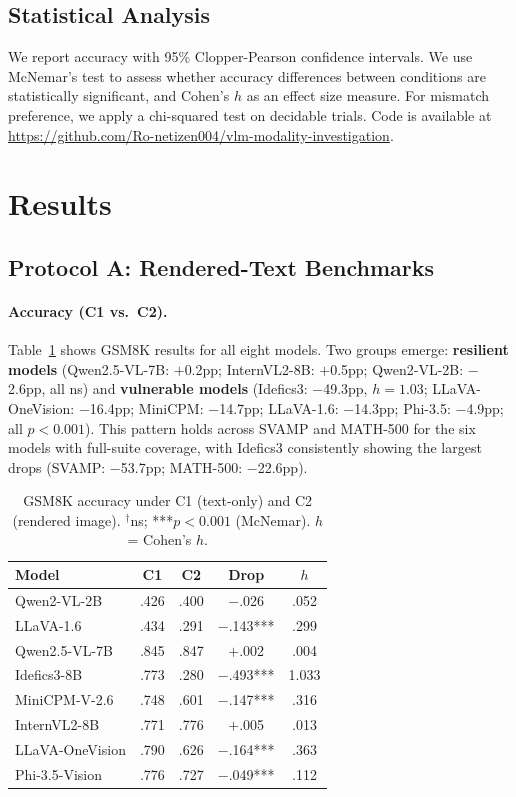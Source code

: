 \documentclass[11pt]{article}
\begin{document}
\subsection{Statistical Analysis}

We report accuracy with 95\% Clopper-Pearson confidence intervals. We use McNemar's test to assess whether accuracy differences between conditions are statistically significant, and Cohen's $h$ as an effect size measure. For mismatch preference, we apply a chi-squared test on decidable trials. Code is available at \url{https://github.com/Ro-netizen004/vlm-modality-investigation}.

\section{Results}

\subsection{Protocol A: Rendered-Text Benchmarks}

\paragraph{Accuracy (C1 vs.\ C2).}
Table~\ref{tab:accuracy_gsm8k} shows GSM8K results for all eight models. Two groups emerge: \textbf{resilient models} (Qwen2.5-VL-7B: $+$0.2pp; InternVL2-8B: $+$0.5pp; Qwen2-VL-2B: $-$2.6pp, all ns) and \textbf{vulnerable models} (Idefics3: $-$49.3pp, $h{=}1.03$; LLaVA-OneVision: $-$16.4pp; MiniCPM: $-$14.7pp; LLaVA-1.6: $-$14.3pp; Phi-3.5: $-$4.9pp; all $p{<}0.001$). This pattern holds across SVAMP and MATH-500 for the six models with full-suite coverage, with Idefics3 consistently showing the largest drops (SVAMP: $-$53.7pp; MATH-500: $-$22.6pp).

\begin{table}[h]
\centering
\small
\begin{tabular}{lcccc}
\toprule
\textbf{Model} & \textbf{C1} & \textbf{C2} & \textbf{Drop} & \textbf{$h$} \\
\midrule
Qwen2-VL-2B        & .426 & .400 & $-$.026\rlap{$^\dagger$} & .052 \\
LLaVA-1.6          & .434 & .291 & $-$.143*** & .299 \\
Qwen2.5-VL-7B      & .845 & .847 & $+$.002\rlap{$^\dagger$} & .004 \\
Idefics3-8B        & .773 & .280 & $-$.493*** & 1.033 \\
MiniCPM-V-2.6      & .748 & .601 & $-$.147*** & .316 \\
InternVL2-8B       & .771 & .776 & $+$.005\rlap{$^\dagger$} & .013 \\
LLaVA-OneVision    & .790 & .626 & $-$.164*** & .363 \\
Phi-3.5-Vision     & .776 & .727 & $-$.049*** & .112 \\
\bottomrule
\end{tabular}
\caption{GSM8K accuracy under C1 (text-only) and C2 (rendered image). $^\dagger$ns; ***$p{<}0.001$ (McNemar). $h$ = Cohen's $h$.}
\label{tab:accuracy_gsm8k}
\end{table}
\end{document}
